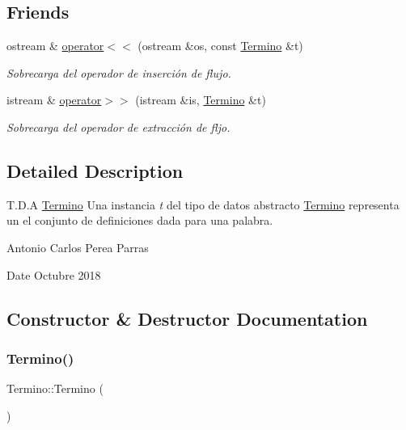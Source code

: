 \subsection*{Friends}
\begin{DoxyCompactItemize}
\item 
ostream \& \mbox{\hyperlink{class_termino_a990203f35e5916790b154a3eb6baf829}{operator$<$$<$}} (ostream \&os, const \mbox{\hyperlink{class_termino}{Termino}} \&t)
\begin{DoxyCompactList}\small\item\em Sobrecarga del operador de inserción de flujo. \end{DoxyCompactList}\item 
istream \& \mbox{\hyperlink{class_termino_a076140e7b0c3bcbe8182d5d201725f9f}{operator$>$$>$}} (istream \&is, \mbox{\hyperlink{class_termino}{Termino}} \&t)
\begin{DoxyCompactList}\small\item\em Sobrecarga del operador de extracción de fljo. \end{DoxyCompactList}\end{DoxyCompactItemize}


\subsection{Detailed Description}
T.\+D.\+A \mbox{\hyperlink{class_termino}{Termino}} Una instancia {\itshape t} del tipo de datos abstracto {\ttfamily \mbox{\hyperlink{class_termino}{Termino}}} representa un el conjunto de definiciones dada para una palabra. 

Antonio Carlos Perea Parras \begin{DoxyDate}{Date}
Octubre 2018 
\end{DoxyDate}


\subsection{Constructor \& Destructor Documentation}
\mbox{\label{class_termino_ac3b1425fec4d38d78c5d36cb5fe8e728}} 
\subsubsection{\texorpdfstring{Termino()}{Termino()}\hspace{0.1cm}{\footnotesize\ttfamily [1/3]}}
{\footnotesize\ttfamily Termino\+::\+Termino (\begin{DoxyParamCaption}{ }\end{DoxyParamCaption})}



